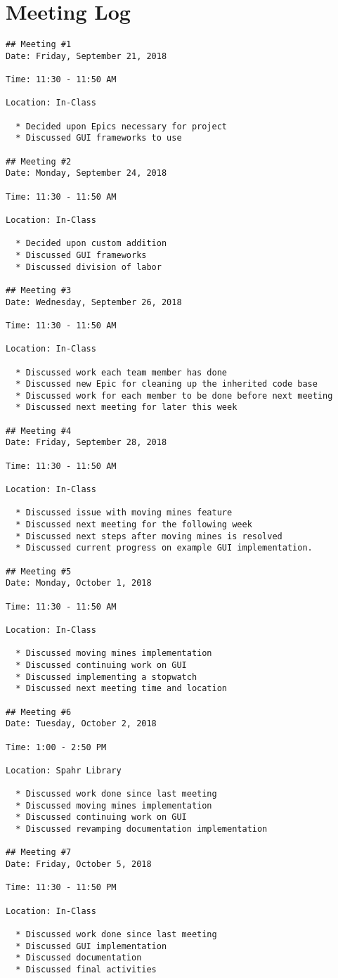 \documentclass[12pt]{report}
\begin{document}
\section*{Meeting Log}
\begin{lstlisting}
## Meeting #1
Date: Friday, September 21, 2018

Time: 11:30 - 11:50 AM

Location: In-Class

  * Decided upon Epics necessary for project
  * Discussed GUI frameworks to use

## Meeting #2
Date: Monday, September 24, 2018

Time: 11:30 - 11:50 AM

Location: In-Class

  * Decided upon custom addition
  * Discussed GUI frameworks
  * Discussed division of labor

## Meeting #3
Date: Wednesday, September 26, 2018

Time: 11:30 - 11:50 AM

Location: In-Class

  * Discussed work each team member has done
  * Discussed new Epic for cleaning up the inherited code base
  * Discussed work for each member to be done before next meeting
  * Discussed next meeting for later this week

## Meeting #4
Date: Friday, September 28, 2018

Time: 11:30 - 11:50 AM

Location: In-Class

  * Discussed issue with moving mines feature
  * Discussed next meeting for the following week
  * Discussed next steps after moving mines is resolved
  * Discussed current progress on example GUI implementation.

## Meeting #5
Date: Monday, October 1, 2018

Time: 11:30 - 11:50 AM

Location: In-Class

  * Discussed moving mines implementation
  * Discussed continuing work on GUI
  * Discussed implementing a stopwatch
  * Discussed next meeting time and location

## Meeting #6
Date: Tuesday, October 2, 2018

Time: 1:00 - 2:50 PM

Location: Spahr Library

  * Discussed work done since last meeting
  * Discussed moving mines implementation
  * Discussed continuing work on GUI
  * Discussed revamping documentation implementation

## Meeting #7
Date: Friday, October 5, 2018

Time: 11:30 - 11:50 PM

Location: In-Class

  * Discussed work done since last meeting
  * Discussed GUI implementation
  * Discussed documentation
  * Discussed final activities
\end{lstlisting}
\end{document}
